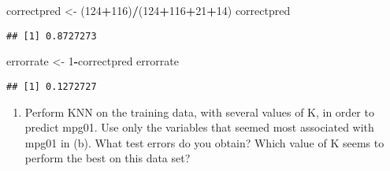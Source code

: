 \documentclass[]{article}
\newenvironment{Shaded}{\begin{snugshade}}{\end{snugshade}}
\newcommand{\KeywordTok}[1]{\textcolor[rgb]{0.13,0.29,0.53}{\textbf{#1}}}
\newcommand{\DataTypeTok}[1]{\textcolor[rgb]{0.13,0.29,0.53}{#1}}
\newcommand{\DecValTok}[1]{\textcolor[rgb]{0.00,0.00,0.81}{#1}}
\newcommand{\StringTok}[1]{\textcolor[rgb]{0.31,0.60,0.02}{#1}}
\newcommand{\CommentTok}[1]{\textcolor[rgb]{0.56,0.35,0.01}{\textit{#1}}}
\newcommand{\OperatorTok}[1]{\textcolor[rgb]{0.81,0.36,0.00}{\textbf{#1}}}
\newcommand{\NormalTok}[1]{#1}
\providecommand{\tightlist}{%
  \setlength{\itemsep}{0pt}\setlength{\parskip}{0pt}}
\begin{document}
\begin{Shaded}
\begin{Highlighting}[]
\NormalTok{correctpred <-}\StringTok{ }\NormalTok{(}\DecValTok{124}\OperatorTok{+}\DecValTok{116}\NormalTok{)}\OperatorTok{/}\NormalTok{(}\DecValTok{124}\OperatorTok{+}\DecValTok{116}\OperatorTok{+}\DecValTok{21}\OperatorTok{+}\DecValTok{14}\NormalTok{)}
\NormalTok{correctpred}
\end{Highlighting}
\end{Shaded}

\begin{verbatim}
## [1] 0.8727273
\end{verbatim}

\begin{Shaded}
\begin{Highlighting}[]
\NormalTok{errorrate <-}\StringTok{ }\DecValTok{1}\OperatorTok{-}\NormalTok{correctpred}
\NormalTok{errorrate}
\end{Highlighting}
\end{Shaded}

\begin{verbatim}
## [1] 0.1272727
\end{verbatim}

\begin{enumerate}
\def\labelenumi{(\alph{enumi})}
\setcounter{enumi}{6}
\tightlist
\item
  Perform KNN on the training data, with several values of K, in order
  to predict mpg01. Use only the variables that seemed most associated
  with mpg01 in (b). What test errors do you obtain? Which value of K
  seems to perform the best on this data set?
\end{enumerate}

\begin{Shaded}
\end{Shaded}
\end{document}
